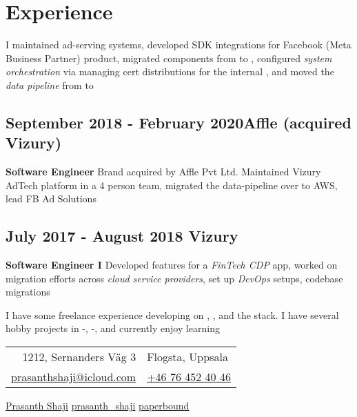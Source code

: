 \documentclass{scrartcl}
\begin{document}
	\section{Experience}

	I maintained ad-serving systems, developed SDK integrations for Facebook (Meta Business Partner) product, migrated components from  to , configured \textit{system orchestration} via  managing  cert distributions for the internal , and moved the \textit{data pipeline} from  to 

		\subsection[Affle]{September 2018 - February 2020\hfill Affle (acquired Vizury)}
		\textbf{Software Engineer}
		Brand acquired by Affle Pvt Ltd. Maintained Vizury AdTech platform in a 4 person team, migrated the  data-pipeline over to AWS, lead FB Ad Solutions

		\subsection[Vizury]{July 2017 - August 2018 \hfill Vizury}
		\textbf{Software Engineer I}
		Developed features for a \textit{FinTech CDP} app, worked on migration efforts across \textit{cloud service providers}, set up \textit{DevOps } setups, codebase migrations \newline

	I have some freelance experience developing on , , and the  stack. I have several hobby projects in -, -, and currently enjoy learning 

	\vfill

	\begin{center}
		\begin{tabular}{rl}
			1212, Sernanders Väg 3 & Flogsta, Uppsala \\
			\href{mailto:prasanthshaji@icloud.com}{prasanthshaji@icloud.com} & \href{tel:+46764524046}{+46 76 452 40 46}
		\end{tabular}
	\end{center}

	\begin{center}
		{\color{blue}}
		\href{https://www.linkedin.com/in/prasanth-shaji-65338b92/}{Prasanth Shaji}
		{\color{cyan}}
		\href{https://twitter.com/prasanth_shaji}{prasanth\_shaji}
		{\color{black}}
		\href{https://github.com/paperbound}{paperbound}
	\end{center}
\end{document}
